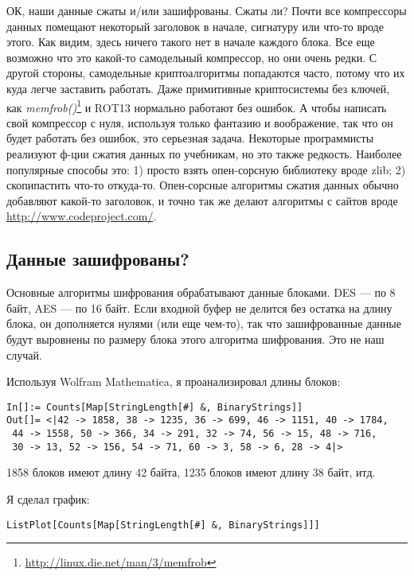 ОК, наши данные сжаты и/или зашифрованы.
Сжаты ли? Почти все компрессоры данных помещают некоторый заголовок в начале, сигнатуру или что-то вроде этого.
Как видим, здесь ничего такого нет в начале каждого блока.
Все еще возможно что это какой-то самодельный компрессор, но они очень редки.
С другой стороны, самодельные криптоалгоритмы попадаются часто, потому что их куда легче заставить работать.
Даже примитивные криптосистемы без ключей, как \emph{memfrob()}\footnote{\url{http://linux.die.net/man/3/memfrob}}
и ROT13 нормально работают без ошибок.
А чтобы написать свой компрессор с нуля, используя только фантазию и воображение, так что он будет работать без ошибок,
это серьезная задача.
Некоторые программисты реализуют ф-ции сжатия данных по учебникам, но это также редкость.
Наиболее популярные способы это:
1) просто взять опен-сорсную библиотеку вроде zlib;
2) скопипастить что-то откуда-то.
Опен-сорсные алгоритмы сжатия данных обычно добавляют какой-то заголовок, и точно так же делают алгоритмы с сайтов вроде
\url{http://www.codeproject.com/}.

\subsection{Данные зашифрованы?}

Основные алгоритмы шифрования обрабатывают данные блоками. DES --- по 8 байт, AES --- по 16 байт.
Если входной буфер не делится без остатка на длину блока, он дополняется нулями (или еще чем-то), так что зашифрованные
данные будут выровнены по размеру блока этого алгоритма шифрования.
Это не наш случай.

Используя Wolfram Mathematica, я проанализировал длины блоков:

\begin{lstlisting}
In[]:= Counts[Map[StringLength[#] &, BinaryStrings]]
Out[]= <|42 -> 1858, 38 -> 1235, 36 -> 699, 46 -> 1151, 40 -> 1784,
 44 -> 1558, 50 -> 366, 34 -> 291, 32 -> 74, 56 -> 15, 48 -> 716,
 30 -> 13, 52 -> 156, 54 -> 71, 60 -> 3, 58 -> 6, 28 -> 4|>
\end{lstlisting}

1858 блоков имеют длину 42 байта, 1235 блоков имеют длину 38 байт, итд.

Я сделал график:

\begin{lstlisting}
ListPlot[Counts[Map[StringLength[#] &, BinaryStrings]]]
\end{lstlisting}

